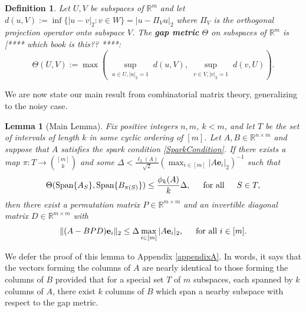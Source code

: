 \documentclass[journal, onecolumn]{IEEEtran}
\newtheorem{lemma}{Lemma}
\newtheorem{definition}{Definition}
\begin{document}
\begin{definition}\label{GapMetricDef}
Let $U, V$ be subspaces of $\mathbb{R}^m$ and let $d(u,V) := \inf\{|u-v|_2: v \in W\} = |u - \Pi_V u|_2$ where $\Pi_V$ is the orthogonal projection operator onto subspace $V$. The \textbf{gap metric} $\Theta$ on subspaces of $\mathbb{R}^{m}$ is \cite{TheoryOfLinearOperatorsPage69} [**** which book is this?? ****:
\begin{equation}\label{SubspaceMetric}
\Theta(U,V) := \max\left( \sup_{\substack{u \in U, |u|_2 = 1}} d(u,V), \sup_{\substack{v \in V, |v|_2 = 1}} d(v,U) \right).
\end{equation}
\end{definition}

We are now state our main result from combinatorial matrix theory, generalizing \cite[Lemma 1]{Hillar15} to the noisy case.


\begin{lemma}[Main Lemma]\label{MainLemma}
Fix positive integers $n, m$, $k < m$, and let $T$ be the set of intervals of length $k$ in some cyclic ordering of $[m]$. Let $A, B \in \mathbb{R}^{n \times m}$ and suppose that $A$ satisfies the spark condition \eqref{SparkCondition}.  If there exists a map $\pi: T \to {[m] \choose k}$ and some $\Delta < \frac{\ell_{2}(A)}{\sqrt{2}} (\max_{i \in [m]}|A\mathbf{e}_i|_2)^{-1}$ such that 
\begin{equation}\label{GapUpperBound}
\Theta(\text{Span}\{A_{S}\}, \text{Span}\{B_{\pi(S)}\}) \leq \frac{ \phi_k(A) }{k} \Delta, \indent \text{for all} \indent S \in T,
\end{equation}
%
then there exist a permutation matrix $P \in \mathbb{R}^{m \times m}$ and an invertible diagonal matrix $D \in \mathbb{R}^{m \times m}$ with
\begin{align}
\|(A - BPD)\mathbf{e}_i\|_2 \leq \Delta \max_{i \in [m]}|A\mathbf{e}_i|_2, \indent \text{for all } i \in [m].
\end{align}
\end{lemma}
We defer the proof of this lemma to Appendix \ref{appendixA}. In words, it says that the vectors forming the columns of $A$ are nearly identical to those forming the columns of $B$ provided that for a special set $T$ of $m$ subspaces, each spanned by $k$ columns of $A$, there exist $k$ columns of $B$ which span a nearby subspace with respect to the gap metric.
\end{document}
